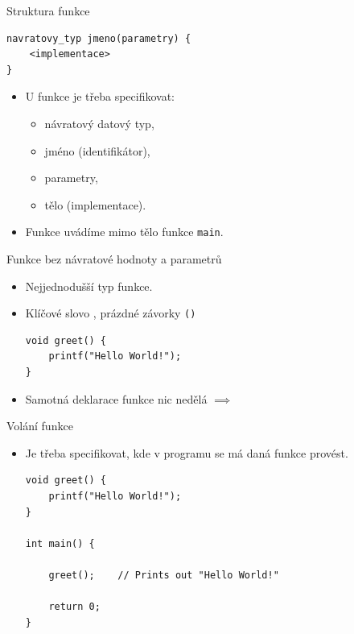 \documentclass[14pt,aspectratio=169]{beamer}
\begin{document}
    \begin{frame}[t,fragile]{Struktura funkce}
        \begin{lstlisting}
navratovy_typ jmeno(parametry) {
    <implementace>
}
        \end{lstlisting}
        \begin{itemize}
            \item U funkce je třeba specifikovat:
            \begin{itemize}
                \item návratový datový typ,
                \item jméno (identifikátor),
                \item parametry,
                \item tělo (implementace).
            \end{itemize}
            \item Funkce uvádíme mimo tělo funkce \texttt{main}.
        \end{itemize}
    \end{frame}

    \begin{frame}[t,fragile]{Funkce bez návratové hodnoty a parametrů}
        \begin{itemize}
            \item Nejjednodušší typ funkce.
            \item Klíčové slovo , prázdné závorky \texttt{()}
            \begin{lstlisting}
void greet() {
    printf("Hello World!");
}
            \end{lstlisting}
            \item Samotná deklarace funkce nic nedělá $\implies$ 
        \end{itemize}
    \end{frame}

    \begin{frame}[t,fragile]{Volání funkce}
        \begin{itemize}
            \item Je třeba specifikovat, kde v programu se má daná funkce provést.
            \begin{lstlisting}
void greet() {
    printf("Hello World!");
}
            
int main() {

    greet();    // Prints out "Hello World!"

    return 0;
}
            \end{lstlisting}
        \end{itemize}
    \end{frame}
\end{document}
